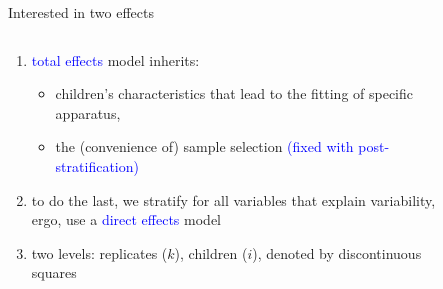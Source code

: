 \begin{frame}
	{Interested in two effects}
	\begin{columns}
		\begin{column}{0.5\textwidth}
			\begin{enumerate}
				\item \textcolor{blue}{total effects} model inherits:
				\begin{itemize}
					\item children’s characteristics that lead to the fitting of specific apparatus,
					\item the (convenience of) sample selection \textcolor{blue}{(fixed with post-stratification)}
				\end{itemize}
				\item to do the last, we stratify for all variables that explain variability, ergo, use a \textcolor{blue}{direct effects} model
				\item two levels: replicates ($k$), children ($i$), denoted by discontinuous squares
			\end{enumerate}
		\end{column}
		\begin{column}{0.5\textwidth}  
			\begin{figure}
\end{figure}
\end{column}
\end{columns}
\end{frame}

